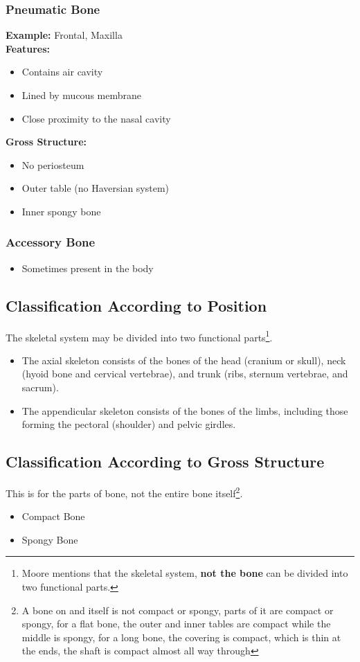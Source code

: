 \documentclass[11pt]{article}
\begin{document}
\subsubsection*{Pneumatic Bone}
\textbf{Example:} Frontal, Maxilla\\
\textbf{Features:}
\begin{itemize}
    \item Contains air cavity
    \item Lined by mucous membrane
    \item Close proximity to the nasal cavity
\end{itemize}
\textbf{Gross Structure:}
\begin{itemize}
    \item No periosteum
    \item Outer table (no Haversian system)
    \item Inner spongy bone
\end{itemize}

\subsubsection*{Accessory Bone}
\begin{itemize}
    \item Sometimes present in the body
\end{itemize}

\subsection{Classification According to Position}
The skeletal system may be divided into two functional parts\footnote{Moore mentions that the skeletal system, \textbf{not the bone} can be divided into two functional parts.\cite[~.p114]{moore2023}}.

\begin{itemize}
    \item The axial skeleton consists of the bones of the head (cranium or skull), neck (hyoid bone and cervical vertebrae), and trunk (ribs, sternum vertebrae, and sacrum).
    \item The appendicular skeleton consists of the bones of the limbs, including those forming the pectoral (shoulder) and pelvic girdles.
\end{itemize}

\subsection{Classification According to Gross Structure}
This is for the parts of bone, not the entire bone itself\footnote{A bone on and itself is not compact or spongy, parts of it are compact or spongy, for a flat bone, the outer and inner tables are compact while the middle is spongy, for a long bone, the covering is compact, which is thin at the ends, the shaft is compact almost all way through}.
\begin{itemize}
    \item Compact Bone
    \item Spongy Bone
\end{itemize}
\end{document}

